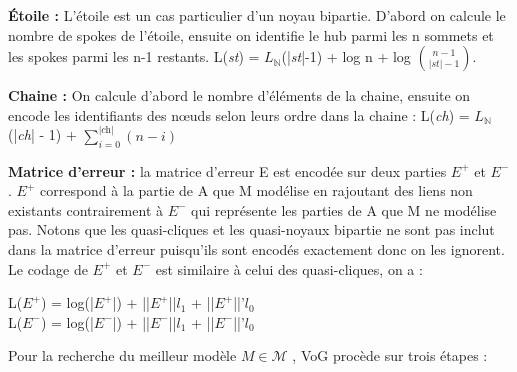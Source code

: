 \textbf{Étoile :} L'étoile est un cas particulier d'un noyau bipartie. D'abord on calcule le nombre de spokes de l'étoile, ensuite on identifie le hub parmi les n sommets et les spokes parmi les n-1 restants.
L(\textit{st}) = $L_{\mathbb{N}}$(|\textit{st}|-1) +  log n + log ${n-1}\choose{|st|-1}$.

\textbf{Chaine :} On calcule d'abord le nombre d'éléments de la chaine, ensuite on encode les identifiants des nœuds selon leurs ordre dans la chaine :
L(\textit{ch}) = $L_{\mathbb{N}}$(|\textit{ch}| - 1) + $\sum\limits_{i=0}^{|\textit{ch}|} ( n - i )$

\textbf{Matrice d'erreur :} la matrice d'erreur E est encodée sur deux parties $E^{+}$ et $E^{-}$. $E^{+}$  correspond à la partie de A que M modélise en rajoutant des liens non existants contrairement à $E^{-}$ qui représente les parties de A que M ne modélise pas. Notons que les quasi-cliques et les quasi-noyaux bipartie ne sont pas inclut dans la matrice d'erreur puisqu'ils sont encodés exactement donc on les ignorent. Le codage de $E^{+}$ et $E^{-}$ est similaire à celui des quasi-cliques, on a :
\begin{center}
L(${E}^{+}$) = log(|${E}^{+}$|) + ||${E}^{+}$||\textit{$l_{1}$} + ||${E}^{+}$||'\textit{$l_{0}$}\\
L(${E}^{-}$) = log(|${E}^{-}$|) + ||${E}^{-}$||\textit{$l_{1}$} + ||${E}^{-}$||'\textit{$l_{0}$}\\
\end{center} 
Pour la recherche du meilleur modèle $ \textit{M} \in \mathcal{M} $ , VoG procède sur trois étapes :
